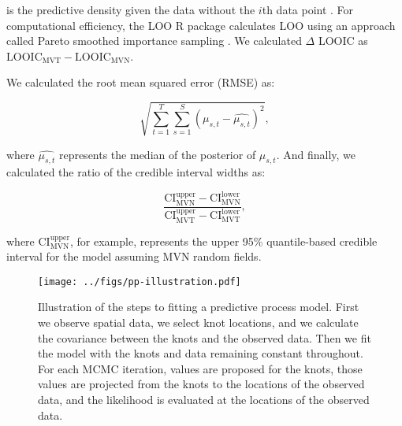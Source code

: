 \documentclass[12pt,english]{article}
\begin{document}
\begin{spacing}{1.4}
\noindent is the predictive density given the data without the $i$th data point
\citep{vehtari2016}. For computational efficiency, the LOO R package calculates
LOO using an approach called Pareto smoothed importance sampling
\citep{vehtari2016}. We calculated $\Delta$ LOOIC as
$\mathrm{LOOIC}_\mathrm{MVT} - \mathrm{LOOIC}_\mathrm{MVN}$.

We calculated the root mean squared error (RMSE) as:

\begin{equation}
  \sqrt{ \sum^{T}_{t=1}{ \sum^{S}_{s=1}{ (\mu_{s,t} - \widehat{ \mu_{s,t} })^2 } } },
\end{equation}

\noindent where $\widehat{\mu_{s,t}}$ represents the median of the posterior of
$\mu_{s,t}$. And finally, we calculated the ratio of the credible interval
widths as:

\begin{equation}
\frac{
\mathrm{CI}_\mathrm{MVN}^\mathrm{upper} - \mathrm{CI}_\mathrm{MVN}^\mathrm{lower}
}{
\mathrm{CI}_\mathrm{MVT}^\mathrm{upper} -
\mathrm{CI}_\mathrm{MVT}^\mathrm{lower}
},
\end{equation}

\noindent where $\mathrm{CI}_\mathrm{MVN}^\mathrm{upper}$, for example,
represents the upper 95\% quantile-based credible interval for the model
assuming MVN random fields.

\clearpage

\end{spacing}

\renewcommand{\thefigure}{S\arabic{figure}}
\renewcommand{\thetable}{S\arabic{table}}
\setcounter{figure}{0}
\setcounter{table}{0}

\begin{figure}[htb]
  \begin{center}
    \texttt{[image: ../figs/pp-illustration.pdf]}
    \caption{
      Illustration of the steps to fitting a predictive process model.
      First we observe spatial data, we select knot locations,
      and we calculate the covariance between the knots and the observed data.
      Then we fit the model with the knots and data remaining constant throughout.
      For each MCMC iteration, values are proposed for the
      knots, those values are projected from the knots to the locations of the observed data,
      and the likelihood is evaluated at the locations of the observed data.}
    \label{fig:didactic}
  \end{center}
\end{figure}
\end{document}

